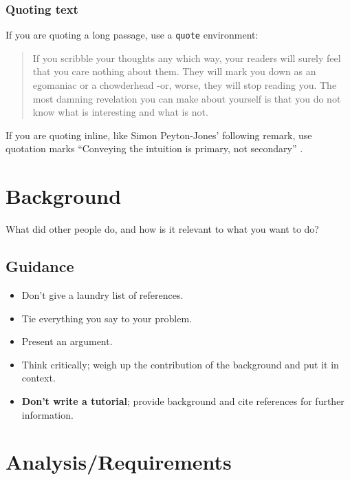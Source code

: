 \documentclass{l4proj}
\begin{document}
\subsection{Quoting text}

If you are quoting a long passage, use a \texttt{quote} environment:

\begin{quote}
     If you scribble your thoughts any which way, your readers will surely feel that you care nothing about them. They will mark you down as an egomaniac or a chowderhead -or, worse, they will stop reading you. The most damning revelation you can make about yourself is that you do not know what is interesting and what is not.
\end{quote} \citep{Von80}

If you are quoting inline, like Simon Peyton-Jones' following remark, use quotation marks ``Conveying the intuition is primary, not
secondary'' \citep{Pey17}.


\chapter{Background}
What did other people do, and how is it relevant to what you want to do?
\section{Guidance}
\begin{itemize}    
    \item
      Don't give a laundry list of references.
    \item
      Tie everything you say to your problem.
    \item
      Present an argument.
    \item Think critically; weigh up the contribution of the background and put it in context.    
    \item
      \textbf{Don't write a tutorial}; provide background and cite
      references for further information.
\end{itemize}

\chapter{Analysis/Requirements}
\end{document}
